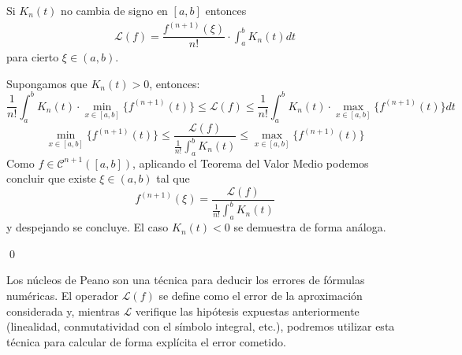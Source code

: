         \begin{cor}
        Si $K_n(t)$ no cambia de signo en $[a,b]$ entonces
        \begin{align}
\mathcal{L}(f)=\dfrac{f^{(n+1)}(\xi)}{n!}\cdot\int_a^bK_n(t)dt
        \label{peano}
        \end{align}
        para cierto $\xi\in(a,b)$.
        \end{cor}
        \begin{dem}
        Supongamos que $K_n(t)>0$, entonces:
        $$\dfrac{1}{n!}\int_a^b K_n(t)\cdot \underset{x\in[a,b]}{\min}\{f^{(n+1)}(t)\}\leq \mathcal{L}(f)\leq \dfrac{1}{n!}\int_a^b K_n(t)\cdot \underset{x\in[a,b]}{\max}\{f^{(n+1)}(t)\}dt$$
        $$ \underset{x\in[a,b]}{\min}\{f^{(n+1)}(t)\}\leq \dfrac{\mathcal{L}(f)}{\frac{1}{n!}\int_a^b K_n(t)}\leq \underset{x\in[a,b]}{\max}\{f^{(n+1)}(t)\}$$
        Como $f\in\mathcal{C}^{n+1}([a,b])$, aplicando el Teorema del Valor Medio podemos concluir que existe $\xi\in(a,b)$ tal que
        $$f^{(n+1)}(\xi)=\dfrac{\mathcal{L}(f)}{\frac{1}{n!}\int_a^b K_n(t)}$$
        y despejando se concluye. El caso $K_n(t)<0$ se demuestra de forma análoga.
        
        
        \qed\end{dem}
        \begin{obs}
        Los núcleos de Peano son una técnica para deducir los errores de fórmulas numéricas. El operador $\mathcal{L}(f)$ se define como el error de la aproximación considerada  y, mientras $\mathcal{L}$ verifique las hipótesis expuestas anteriormente (linealidad, conmutatividad con el símbolo integral, etc.), podremos utilizar esta técnica para calcular de forma explícita el error cometido.

        \end{obs}
